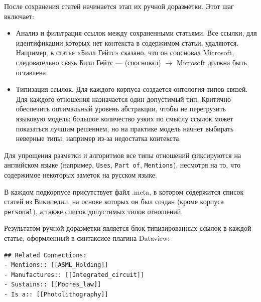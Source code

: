 После сохранения статей начинается этап их ручной доразметки.
Этот шаг включает:
\begin{itemize}
      \item Анализ и фильтрация ссылок между сохраненными статьями.
            Все ссылки, для идентификации которых нет контекста в содержимом статьи, удаляются.
            Например, в статье «Билл Гейтс» сказано, что он соосновал Microsoft, следовательно связь
            Билл Гейтс --- (соосновал) $\rightarrow$ Microsoft должна быть оставлена.
      \item Типизация ссылок. Для каждого корпуса создается онтология типов связей.
            Для каждого отношения назначается один допустимый тип.
            Критично обеспечить оптимальный уровень абстракции,
            чтобы не перегрузить языковую модель:
            большое количество узких по смыслу ссылок может показаться лучшим решением,
            но на практике модель начнет выбирать неверные типы, например из-за недостатка контекста.
\end{itemize}

Для упрощения разметки и алгоритмов
все типы отношений
фиксируются на английском языке
(например, \texttt{Uses}, \texttt{Part of}, \texttt{Mentions}),
несмотря на то, что содержимое
некоторых заметок на русском языке.

В каждом подкорпусе присутствует файл .meta,
в котором содержится список статей из Википедии,
на основе которых он был создан (кроме корпуса \texttt{personal}),
а также список допустимых типов отношений.

Результатом ручной доразметки является блок типизированных ссылок
в каждой статье,
оформленный в синтаксисе плагина Dataview:

\begin{verbatim}
## Related Connections:
- Mentions:: [[ASML_Holding]]
- Manufactures:: [[Integrated_circuit]]
- Sustains:: [[Moores_law]]
- Is a:: [[Photolithography]]
\end{verbatim}

